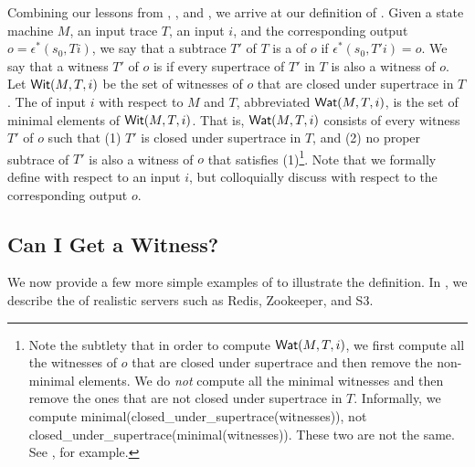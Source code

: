Combining our lessons from ,
, and , we arrive
at our definition of \watprovenance{}. Given a state machine $M$, an input
trace $T$, an input $i$, and the corresponding output $o = \epsilon^*(s_0,
Ti)$, we say that a subtrace $T'$ of $T$ is a  of $o$ if
$\epsilon^*(s_0, T'i) = o$. We say that a witness $T'$ of $o$ is
 if every supertrace of $T'$ in $T$ is
also a witness of $o$. Let $\textsf{Wit}(M, T, i)$ be the set of witnesses of $o$ that
are closed under supertrace in $T$. The  of input $i$
with respect to $M$ and $T$, abbreviated $\textsf{Wat}(M, T, i)$, is the set of minimal
elements of $\textsf{Wit}(M, T, i)$. That is, $\textsf{Wat}(M, T, i)$ consists of every witness
$T'$ of $o$ such that (1) $T'$ is closed under supertrace in $T$, and (2) no
proper subtrace of $T'$ is also a witness of $o$ that satisfies (1)\footnote{%
  Note the subtlety that in order to compute $\textsf{Wat}(M, T, i)$, we first compute
  all the witnesses of $o$ that are closed under supertrace and then remove the
  non-minimal elements. We do \emph{not} compute all the minimal witnesses and
  then remove the ones that are not closed under supertrace in $T$.
  Informally, we compute minimal(closed\_under\_supertrace(witnesses)), not
  closed\_under\_supertrace(minimal(witnesses)).
  These two are not the same. See , for example.
}. Note that we formally define \watprovenance{} with respect to an input $i$,
but colloquially discuss \watprovenance{} with respect to the corresponding
output $o$.

\subsection{Can I Get a Witness?}
We now provide a few more simple examples of \watprovenance{} to illustrate
the definition. In , we describe the \watprovenance{} of
realistic servers such as Redis, Zookeeper, and S3.

